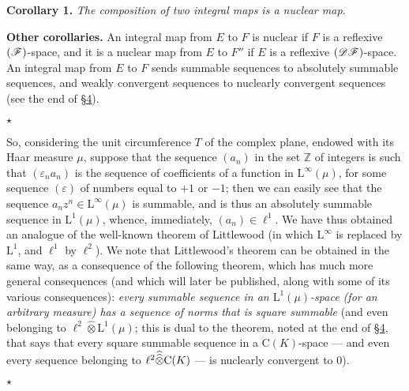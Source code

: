 \documentclass{article}
\theoremstyle{plain}
\newenvironment{itenv}[1]
  {\phantomsection\par\medskip\noindent\textbf{#1.}\itshape}
  {\medskip}
\newenvironment{rmenv}[1]
  {\phantomsection\par\medskip\noindent\textbf{#1.}\rmfamily}
  {\medskip}
\newcommand{\aster}[1]{$\star${#1}$\star$}
\newcommand{\LL}{\mathrm{L}}
\newcommand{\CC}{\mathrm{C}}
\renewcommand{\ll}{\ell}
\newcommand{\DF}{\mbox{\normalfont($\mathscr{DF}$)}}
\newcommand{\FF}{\mbox{\normalfont($\mathscr{F}$)}}
\newcommand{\hotimes}{\widehat{\otimes}}
\newcommand{\hhotimes}{\skew{0}{\widehat}{\skew{0}\widehat{\otimes}}}
\newcommand{\oldpage}[1]{\marginpar{\footnotesize$\Big\vert$ \textit{p.~#1}}}
\begin{document}
\begin{itenv}{Corollary 1}
\label{1.corollary1}
  The composition of two integral maps is a nuclear map.
\end{itenv}

\begin{rmenv}{Other corollaries}
  An integral map from $E$ to $F$ is nuclear if $F$ is a reflexive $\FF$-space, and it is
\oldpage{90}
  a nuclear map from $E$ to $F''$ if $E$ is a reflexive $\DF$-space.
  An integral map from $E$ to $F$ sends summable sequences to absolutely summable sequences, and weakly convergent sequences to nuclearly convergent sequences (see the end of \hyperref[1.4]{\S4}).
\end{rmenv}

\aster{
  So, considering the unit circumference $T$ of the complex plane, endowed with its Haar measure $\mu$, suppose that the sequence $(a_n)$ in the set $\mathbb{Z}$ of integers is such that $(\varepsilon_n a_n)$ is the sequence of coefficients of a function in $\LL^\infty(\mu)$, for some sequence $(\varepsilon)$ of numbers equal to $+1$ or $-1$;
  then we can easily see that the sequence $a_nz^n\in\LL^\infty(\mu)$ is summable, and is thus an absolutely summable sequence in $\LL^1(\mu)$, whence, immediately, $(a_n)\in\ll^1$.
  We have thus obtained an analogue of the well-known theorem of Littlewood (in which $\LL^\infty$ is replaced by $\LL^1$, and $\ell^1$ by $\ell^2$).
  We note that Littlewood's theorem can be obtained in the same way, as a consequence of the following theorem, which has much more general consequences (and which will later be published, along with some of its various consequences):
  \emph{every summable sequence in an $\LL^1(\mu)$-space (for an arbitrary measure) has a sequence of norms that is square summable} (and even belonging to $\ell^2\hotimes\LL^1(\mu)$;
  this is dual to the theorem, noted at the end of \hyperref[1.4]{\S4}, that says that every square summable sequence in a $\CC(K)$-space --- and even every sequence belonging to $\ell^2\hhotimes\CC(K)$ --- is nuclearly convergent to $0$).

}
\end{document}
